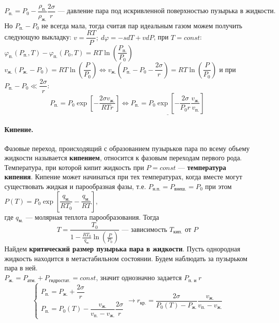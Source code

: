 $$P_\text{п.}=P_0-\dfrac{\rho_\text{п.}}{\rho_\text{ж.}}\dfrac{2\sigma}{r}\text{ --- давление пара под искривленной поверхностью пузырька в жидкости.}$$
Но $P_\text{п.}-P_0$ не всегда мала, тогда считая пар идеальным газом можем получить следующую выкладку: $v=\dfrac{RT}{P};\ d\varphi=-sdT+vdP$, при $T=const$: $\varphi_\text{п.}(P_\text{п.},T)-\varphi_\text{п.}(P_0,T)=RT\ln\left(\dfrac{P_\text{п.}}{P_0}\right)$\\
$v_\text{ж.}(P_\text{ж.}-P_0)=RT\ln\left(\dfrac{P}{P_0}\right)\Leftrightarrow v_\text{ж.}\left(P_\text{п.}-P_0-\dfrac{2\sigma}{r}\right)=RT\ln\left(\dfrac{P}{P_0}\right)$ и при $P_\text{п.}-P_0\ll\dfrac{2\sigma}{r}:$
$$P_\text{п.}=P_0\exp\left[-\dfrac{2\sigma v_\text{ж.}}{RTr}\right]\Leftrightarrow \underline{P_\text{п.}=P_0\exp\left[-\dfrac{2\sigma}{P_0r}\dfrac{v_\text{ж.}}{v_\text{п.}}\right]}$$
\paragraph{Кипение.} Фазовые переход, происходящий с образованием пузырьков пара по всему объему жидкости называется \textbf{кипением}, относится к фазовым переходам первого рода. Температура, при которой кипит жидкость при \underline{$P=const$} --- \textbf{температура кипения}. Кипение может начинаться при тех температурах, когда вместе могут существовать жидкая и парообразная фазы, т.е. $P_\text{н.п.}=P_\text{внеш.}=P_0$ при этом $P(T)=P_0\exp\left[\dfrac{q_\text{м.}}{RT_0}-\dfrac{q_\text{м.}}{RT}\right]$,\\
где $q_\text{м.}$ --- молярная теплота парообразования. Тогда
$$T=\dfrac{T_0}{1-\frac{RT_0}{q_\text{м.}}\ln\left(\frac{P}{P_0}\right)}\text{ --- зависимость $T_\text{кип.}$ от $P$}$$ 
Найдем \textbf{критический размер пузырька пара в жидкости}. Пусть однородная жидкость находится в метастабильном состоянии. Будем наблюдать за пузырьком пара в ней.\\
$P_\text{ж.}=P_\text{атм.}+P_\text{гидростат.}=const$, значит однозначно задается $P_\text{п. и }r$
\begin{equation*}
\begin{cases}
P_\text{п.}=P_\text{ж.}+\dfrac{2\sigma}{r}\\
P_\text{п.}=P_0(T)-\dfrac{v_\text{ж.}}{v_\text{п.}-v_\text{ж.}}\dfrac{2\sigma}{r}
\end{cases}
\longrightarrow r_\text{кр.}=\dfrac{2\sigma}{P_0(T)-P_\text{ж.}}\dfrac{v_\text{ж.}}{v_\text{п.}-v_\text{ж.}}
\end{equation*}

